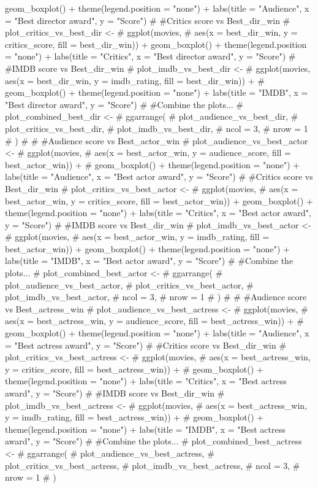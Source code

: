 \documentclass[]{article}
\begin{document}
{geom\_boxplot() + theme(legend.position = "none") + labs(title = "Audience", x = "Best director award", y = "Score") \# \#Critics score vs Best\_dir\_win \# plot\_critics\_vs\_best\_dir \textless{}- \#   ggplot(movies, \#          aes(x = best\_dir\_win, y = critics\_score, fill = best\_dir\_win)) + geom\_boxplot() + theme(legend.position = "none") + labs(title = "Critics", x = "Best director award", y = "Score") \# \#IMDB score vs Best\_dir\_win \# plot\_imdb\_vs\_best\_dir \textless{}- \#   ggplot(movies, aes(x = best\_dir\_win, y = imdb\_rating, fill = best\_dir\_win)) + \#   geom\_boxplot() + theme(legend.position = "none") + labs(title = "IMDB", x = "Best director award", y = "Score") \# \#Combine the plots... \# plot\_combined\_best\_dir \textless{}- \#   ggarrange( \#     plot\_audience\_vs\_best\_dir, \#     plot\_critics\_vs\_best\_dir, \#     plot\_imdb\_vs\_best\_dir, \#     ncol = 3, \#     nrow = 1 \#   ) \#  \# \#Audience score vs Best\_actor\_win \# plot\_audience\_vs\_best\_actor \textless{}- \#   ggplot(movies, \#          aes(x = best\_actor\_win, y = audience\_score, fill = best\_actor\_win)) + \#   geom\_boxplot() + theme(legend.position = "none") + labs(title = "Audience", x = "Best actor award", y = "Score") \# \#Critics score vs Best\_dir\_win \# plot\_critics\_vs\_best\_actor \textless{}- \#   ggplot(movies, \#          aes(x = best\_actor\_win, y = critics\_score, fill = best\_actor\_win)) + geom\_boxplot() + theme(legend.position = "none") + labs(title = "Critics", x = "Best actor award", y = "Score") \# \#IMDB score vs Best\_dir\_win \# plot\_imdb\_vs\_best\_actor \textless{}- \#   ggplot(movies, \#          aes(x = best\_actor\_win, y = imdb\_rating, fill = best\_actor\_win)) + geom\_boxplot() + theme(legend.position = "none") + labs(title = "IMDB", x = "Best actor award", y = "Score") \# \#Combine the plots... \# plot\_combined\_best\_actor \textless{}- \#   ggarrange( \#     plot\_audience\_vs\_best\_actor, \#     plot\_critics\_vs\_best\_actor, \#     plot\_imdb\_vs\_best\_actor, \#     ncol = 3, \#     nrow = 1 \#   ) \#  \# \#Audience score vs Best\_actress\_win \# plot\_audience\_vs\_best\_actress \textless{}- \#   ggplot(movies, \#          aes(x = best\_actress\_win, y = audience\_score, fill = best\_actress\_win)) + \#   geom\_boxplot() + theme(legend.position = "none") + labs(title = "Audience", x = "Best actress award", y = "Score") \# \#Critics score vs Best\_dir\_win \# plot\_critics\_vs\_best\_actress \textless{}- \#   ggplot(movies, \#          aes(x = best\_actress\_win, y = critics\_score, fill = best\_actress\_win)) + \#   geom\_boxplot() + theme(legend.position = "none") + labs(title = "Critics", x = "Best actress award", y = "Score") \# \#IMDB score vs Best\_dir\_win \# plot\_imdb\_vs\_best\_actress \textless{}- \#   ggplot(movies, \#          aes(x = best\_actress\_win, y = imdb\_rating, fill = best\_actress\_win)) + \#   geom\_boxplot() + theme(legend.position = "none") + labs(title = "IMDB", x = "Best actress award", y = "Score") \# \#Combine the plots... \# plot\_combined\_best\_actress \textless{}- \#   ggarrange( \#     plot\_audience\_vs\_best\_actress, \#     plot\_critics\_vs\_best\_actress, \#     plot\_imdb\_vs\_best\_actress, \#     ncol = 3, \#     nrow = 1 \#   ) }
\end{document}
